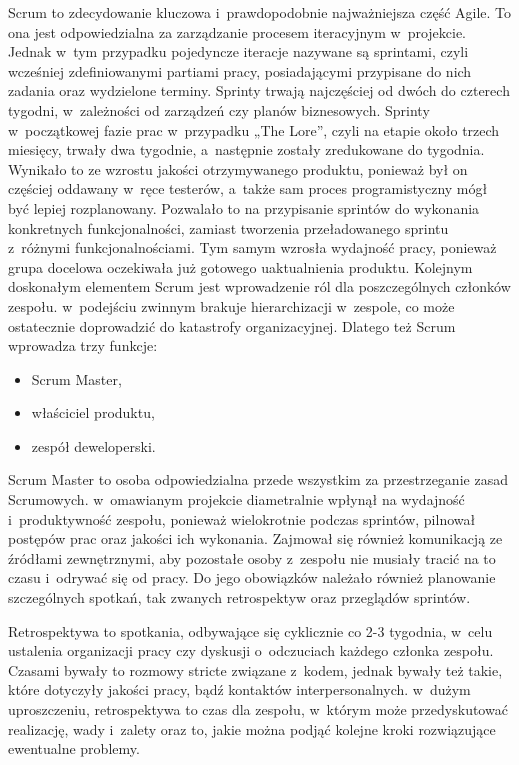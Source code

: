 \documentclass[oneside,polski,logo]{amuthesis}
\begin{document}
Scrum to zdecydowanie kluczowa i~prawdopodobnie najważniejsza część Agile. To ona jest odpowiedzialna za zarządzanie procesem iteracyjnym w~projekcie. Jednak w~tym przypadku pojedyncze iteracje nazywane są sprintami, czyli wcześniej zdefiniowanymi partiami pracy, posiadającymi przypisane do nich zadania oraz wydzielone terminy. Sprinty trwają najczęściej od dwóch do czterech tygodni, w~zależności od zarządzeń czy planów biznesowych. Sprinty w~początkowej fazie prac w~przypadku „The Lore”, czyli na etapie około trzech miesięcy, trwały dwa tygodnie, a~następnie zostały zredukowane do tygodnia. Wynikało to ze wzrostu jakości otrzymywanego produktu, ponieważ był on częściej oddawany w~ręce testerów, a~także sam proces programistyczny mógł być lepiej rozplanowany. Pozwalało to na przypisanie sprintów do wykonania konkretnych funkcjonalności, zamiast tworzenia przeładowanego sprintu z~różnymi funkcjonalnościami. Tym samym wzrosła wydajność pracy, ponieważ grupa docelowa oczekiwała już gotowego uaktualnienia produktu. Kolejnym doskonałym elementem Scrum jest wprowadzenie ról dla poszczególnych członków zespołu. w~podejściu zwinnym brakuje hierarchizacji w~zespole, co może ostatecznie doprowadzić do katastrofy organizacyjnej. \cite{agileHunt} Dlatego też Scrum wprowadza trzy funkcje:

\begin{itemize}
	\item Scrum Master,
	\item właściciel produktu,
	\item zespół deweloperski.
\end{itemize}

Scrum Master to osoba odpowiedzialna przede wszystkim za przestrzeganie zasad Scrumowych. w~omawianym projekcie diametralnie wpłynął na wydajność i~produktywność zespołu, ponieważ wielokrotnie podczas sprintów, pilnował postępów prac oraz jakości ich wykonania. Zajmował się również komunikacją ze źródłami zewnętrznymi, aby pozostałe osoby z~zespołu nie musiały tracić na to czasu i~odrywać się od pracy. Do jego obowiązków należało również planowanie szczególnych spotkań, tak zwanych retrospektyw oraz przeglądów sprintów.

Retrospektywa to spotkania, odbywające się cyklicznie co 2-3 tygodnia, w~celu ustalenia organizacji pracy czy dyskusji o~odczuciach każdego członka zespołu. Czasami bywały to rozmowy stricte związane z~kodem, jednak bywały też takie, które dotyczyły jakości pracy, bądź kontaktów interpersonalnych. w~dużym uproszczeniu, retrospektywa to czas dla zespołu, w~którym może przedyskutować realizację, wady i~zalety oraz to, jakie można podjąć kolejne kroki rozwiązujące ewentualne problemy.
\end{document}
